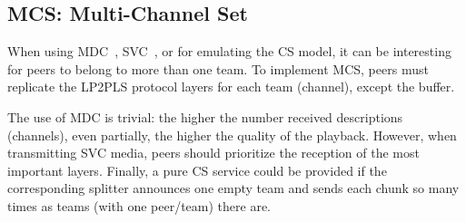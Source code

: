 \subsection{MCS: Multi-Channel Set}
\label{sec:MCS}
When using MDC~\cite{baccichet2007content}, SVC~\cite{chu2009auction},
or for emulating the CS model, it can be interesting for peers to
belong to more than one team. To implement MCS, peers must replicate
the LP2PLS protocol layers for each team (channel), except the buffer.

The use of MDC is trivial: the higher the number received descriptions
(channels), even partially, the higher the quality of the
playback. However, when transmitting SVC media, peers should
prioritize the reception of the most important layers. Finally, a
pure CS service could be provided if the corresponding splitter
announces one empty team and sends each chunk so many times as teams
(with one peer/team) there are.
